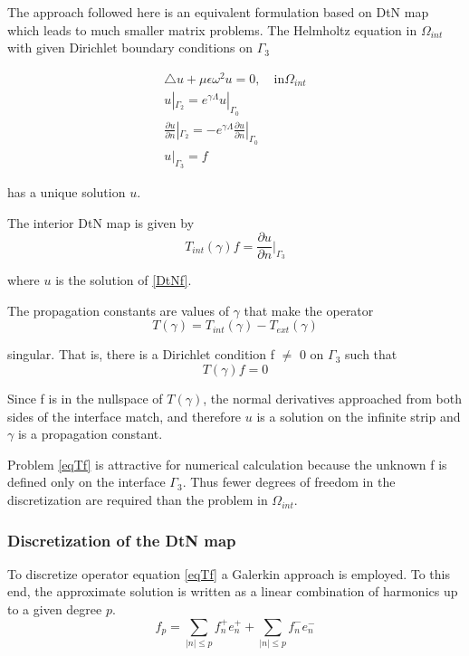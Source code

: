 The approach followed here is an equivalent formulation based on DtN
map which leads to much smaller matrix problems. The Helmholtz
equation in $\Omega_{int}$ with given Dirichlet boundary conditions on
$\Gamma_3$

\begin{equation}
\begin{array}{ll}
\triangle u + \mu \epsilon \omega^2 u = 0, \quad \textrm{in}
\Omega_{int} \\
u|_{\Gamma_2} = e^{\gamma \Lambda} u|_{\Gamma_0} \\
\frac{\partial u}{\partial n} |_{\Gamma_2} = -e^{\gamma \Lambda}
 \frac{\partial u}{\partial n} |_{\Gamma_0} \\
u|_{\Gamma_3} = f
\end{array}
\label{DtNf}
\end{equation} 

has a unique solution $u$.

The interior DtN map is given by
\begin{equation}
  T_{int}(\gamma) f = \frac{\partial u}{\partial n} |_{\Gamma_3}
\end{equation} 

where $u$ is the solution of \ref{DtNf}.

The propagation constants are values of $\gamma$ that make the operator
\begin{equation}
T(\gamma) = T_{int}(\gamma) - T_{ext}(\gamma)
\label{eqTdiff}
\end{equation} 

singular. That is, there is a Dirichlet condition f $\neq$ 0 on
$\Gamma_3$ such that
\begin{equation}
T(\gamma) f = 0
\label{eqTf}
\end{equation}

Since f is in the nullspace of $T(\gamma)$, the normal derivatives
approached from both sides of the interface match, and therefore $u$
is a solution on the infinite strip and $\gamma$ is a propagation
constant.

Problem \ref{eqTf} is attractive for numerical calculation because the
unknown f is defined only on the interface $\Gamma_3$. Thus fewer
degrees of freedom in the discretization are required than the problem
in $\Omega_{int}$.

\subsubsection{Discretization of the DtN map}
To discretize operator equation \ref{eqTf} a Galerkin approach is
employed. To this end, the approximate solution is written as a linear
combination of harmonics up to a given degree $p$.
\begin{equation}
f_p = \sum_{|n|\leq p} f_n^+ e_n^+ + \sum_{|n| \leq p} f_n^- e_n^-
\label{eqfp}
\end{equation} 

